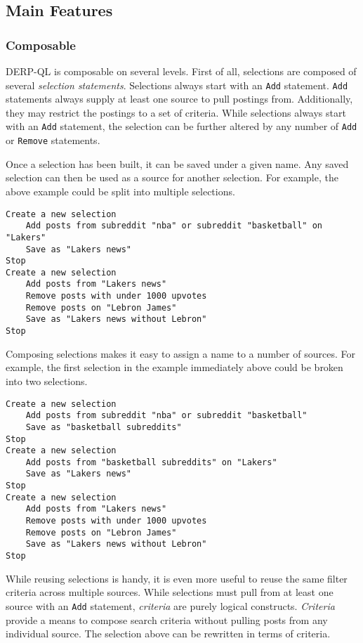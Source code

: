 \subsection{Main Features}
\subsubsection{Composable}
\label{subsub:Composable}
DERP-QL is composable on several levels. First of all, selections are composed of several \textit{selection statements}.
Selections always start with an \texttt{Add} statement. \texttt{Add} statements always supply at least one source to pull postings from. Additionally, they may restrict the postings to a set of criteria. While selections always start with an \texttt{Add} statement, the selection can be further altered by any number of \texttt{Add} or \texttt{Remove} statements. 

Once a selection has been built, it can be saved under a given name. Any saved selection can then be used as a source for another selection. For example, the above example could be split into multiple selections.

\begin{lstlisting}
Create a new selection
    Add posts from subreddit "nba" or subreddit "basketball" on "Lakers"
    Save as "Lakers news"
Stop
Create a new selection
    Add posts from "Lakers news"
    Remove posts with under 1000 upvotes
    Remove posts on "Lebron James"
    Save as "Lakers news without Lebron"
Stop
\end{lstlisting}

Composing selections makes it easy to assign a name to a number of sources. For example, the first selection in the example immediately above could be broken into two selections.

\begin{lstlisting}
Create a new selection
    Add posts from subreddit "nba" or subreddit "basketball" 
    Save as "basketball subreddits"
Stop
Create a new selection
    Add posts from "basketball subreddits" on "Lakers"
    Save as "Lakers news"
Stop
Create a new selection
    Add posts from "Lakers news"
    Remove posts with under 1000 upvotes
    Remove posts on "Lebron James"
    Save as "Lakers news without Lebron"
Stop
\end{lstlisting}

While reusing selections is handy, it is even more useful to reuse the same filter criteria across multiple sources.
While selections must pull from at least one source with an \texttt{Add} statement, \textit{criteria}\label{create:criteria} are purely logical constructs. \textit{Criteria} provide a means to compose search criteria without pulling posts from any individual source. The selection above can be rewritten in terms of criteria.

